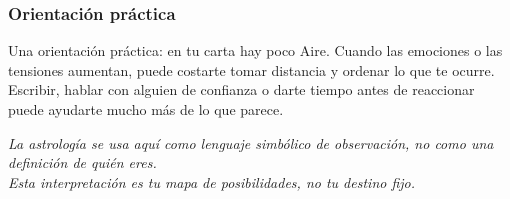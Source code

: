 \documentclass[11pt,a4paper]{article}\usepackage[utf8]{inputenc}
\begin{document}
\subsubsection*{Orientación práctica}
Una orientación práctica: en tu carta hay poco Aire. Cuando las emociones o las tensiones aumentan, puede costarte tomar distancia y ordenar lo que te ocurre. Escribir, hablar con alguien de confianza o darte tiempo antes de reaccionar puede ayudarte mucho más de lo que parece.

\vspace{1cm}
\begin{center}
{\small\itshape\color{grisai}
La astrología se usa aquí como lenguaje simbólico de observación, no como una definición de quién eres.\\
Esta interpretación es tu mapa de posibilidades, no tu destino fijo.
}
\end{center}
\end{document}
